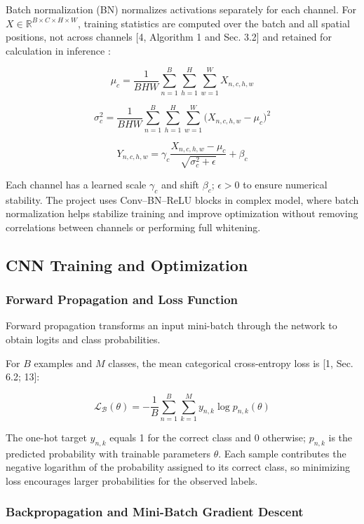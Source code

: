 \documentclass[11pt,a4paper]{article}
\begin{document}
Batch normalization (BN) normalizes activations separately for each channel. For \(X\in {\mathbb{R}}^{B\times C\times H\times W}\), training statistics are computed over the batch and all spatial positions, not across channels [4, Algorithm 1 and Sec. 3.2] and retained for calculation in inference :

\[
{\mu }_{c}=\frac{1}{BHW}\sum _{n=1}^{B} \sum _{h=1}^{H} \sum _{w=1}^{W} {X}_{n,c,h,w}
\]

\[
{\sigma }_{c}^{2}=\frac{1}{BHW}\sum _{n=1}^{B} \sum _{h=1}^{H} \sum _{w=1}^{W} ({X}_{n,c,h,w}-{\mu }_{c}{)}^{2}
\]

\[
{Y}_{n,c,h,w}={\gamma }_{c}\frac{{X}_{n,c,h,w}-{\mu }_{c}}{\sqrt{{\sigma }_{c}^{2}+\epsilon }}+{\beta }_{c}
\]

Each channel has a learned scale \({\gamma }_{c}\) and shift \({\beta }_{c}\); \(\epsilon >0\) to ensure numerical stability. The project uses Conv--BN--ReLU blocks in complex model, where batch normalization helps stabilize training and improve optimization without removing correlations between channels or performing full whitening.

\subsection{CNN Training and Optimization}\label{theory:2.3}

\subsubsection{Forward Propagation and Loss Function}\label{theory:2.3.1}

Forward propagation transforms an input mini-batch through the network to obtain logits and class probabilities.

For \(B\) examples and \(M\) classes, the mean categorical cross-entropy loss is [1, Sec. 6.2; 13]:

\[
{\mathcal{L}}_{\mathcal{B}}(\theta )=-\frac{1}{B}\sum _{n=1}^{B} \sum _{k=1}^{M} {y}_{n,k}\log {p}_{n,k}(\theta )
\]

The one-hot target \({y}_{n,k}\) equals 1 for the correct class and 0 otherwise; \({p}_{n,k}\) is the predicted probability with trainable parameters \(\theta .\) Each sample contributes the negative logarithm of the probability assigned to its correct class, so minimizing loss encourages larger probabilities for the observed labels.

\subsubsection{Backpropagation and Mini-Batch Gradient Descent}\label{theory:2.3.2}
\end{document}
